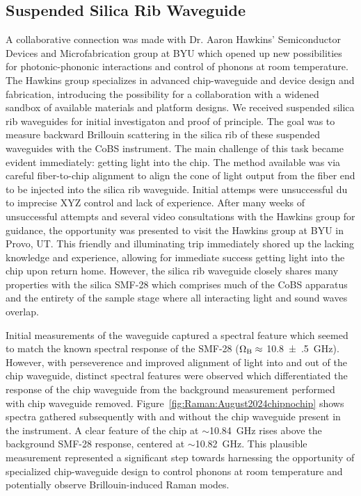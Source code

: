 \subsection{Suspended Silica Rib Waveguide}
\label{subsec:Raman:Target:Waveguide}

A collaborative connection was made with Dr. Aaron Hawkins' Semiconductor Devices and Microfabrication group at \ac{BYU} which opened up new possibilities for photonic-phononic interactions and control of phonons at room temperature. The Hawkins group specializes in advanced chip-waveguide and device design and fabrication, introducing the possibility for a collaboration with a widened sandbox of available materials and platform designs. We received suspended silica rib waveguides for initial investigaton and proof of principle. The goal was to measure backward Brillouin scattering in the silica rib of these suspended waveguides with the \ac{CoBS} instrument. The main challenge of this task became evident immediately: getting light into the chip. The method available was via careful fiber-to-chip alignment to align the cone of light output from the fiber end to be injected into the silica rib waveguide. Initial attemps were unsuccessful du to imprecise XYZ control and lack of experience. After many weeks of unsuccessful attempts and several video consultations with the Hawkins group for guidance, the opportunity was presented to visit the Hawkins group at \ac{BYU} in Provo, UT. This friendly and illuminating trip immediately shored up the lacking knowledge and experience, allowing for immediate success getting light into the chip upon return home. However, the silica rib waveguide closely shares many properties with the silica \ac{SMF-28} which comprises much of the \ac{CoBS} apparatus and the entirety of the sample stage where all interacting light and sound waves overlap.

Initial measurements of the waveguide captured a spectral feature which seemed to match the known spectral response of the \ac{SMF-28} (\(\Omega_{\rm B} \approx\) \SI{10.8(5)}{\giga\hertz}). However, with perseverence and improved alignment of light into and out of the chip waveguide, distinct spectral features were observed which differentiated the response of the chip waveguide from the background measurement performed with chip waveguide removed. Figure~\ref{fig:Raman:August2024chipnochip} shows spectra gathered subsequently with and without the chip waveguide present in the instrument. A clear feature of the chip at \(\sim\)\SI{10.84}{\giga\hertz} rises above the background \ac{SMF-28} response, centered at \(\sim\)\SI{10.82}{\giga\hertz}. This plausible measurement represented a significant step towards harnessing the opportunity of specialized chip-waveguide design to control phonons at room temperature and potentially observe Brillouin-induced Raman modes.

